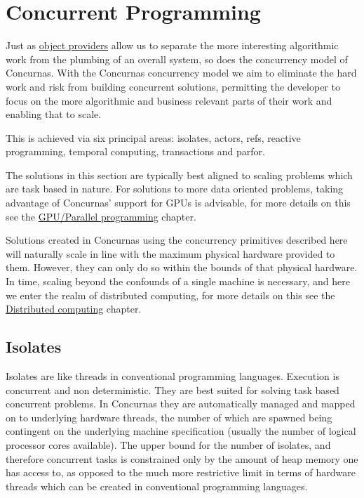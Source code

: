 \documentclass[conc-doc]{subfiles}
\begin{document}
	
	\chapter[Concurrent Programming]{Concurrent Programming}
		

Just as \hyperref[ch:ObjProviders]{object providers} allow us to separate the more interesting algorithmic work from the plumbing of an overall system, so does the concurrency model of Concurnas. With the Concurnas concurrency model we aim to eliminate the hard work and risk from building concurrent solutions, permitting the developer to focus on the more algorithmic and business relevant parts of their work and enabling that to scale.

This is achieved via six principal areas: isolates, actors, refs, reactive programming, temporal computing, transactions and parfor. 

The solutions in this section are typically best aligned to scaling problems which are task based in nature. For solutions to more data oriented problems, taking advantage of Concurnas' support for GPUs is advisable, for more details on this see the \hyperref[ch:gpuprogramming]{GPU/Parallel programming} chapter.

Solutions created in Concurnas using the concurrency primitives described here will naturally scale in line with the maximum physical hardware provided to them. However, they can only do so within the bounds of that physical hardware. In time, scaling beyond the confounds of a single machine is necessary, and here we enter the realm of distributed computing, for more details on this see the \hyperref[ch:distComp]{Distributed computing} chapter.

\section{Isolates}
Isolates are like threads in conventional programming languages. Execution is concurrent and non deterministic. They are best suited for solving task based concurrent problems. In Concurnas they are automatically managed and mapped on to underlying hardware threads, the number of which are spawned being contingent on the underlying machine specification (usually the number of logical processor cores available). The upper bound for the number of isolates, and therefore concurrent tasks is constrained only by the amount of heap memory one has access to, as opposed to the much more restrictive limit in terms of hardware threads which can be created in conventional programming languages.
\end{document}
